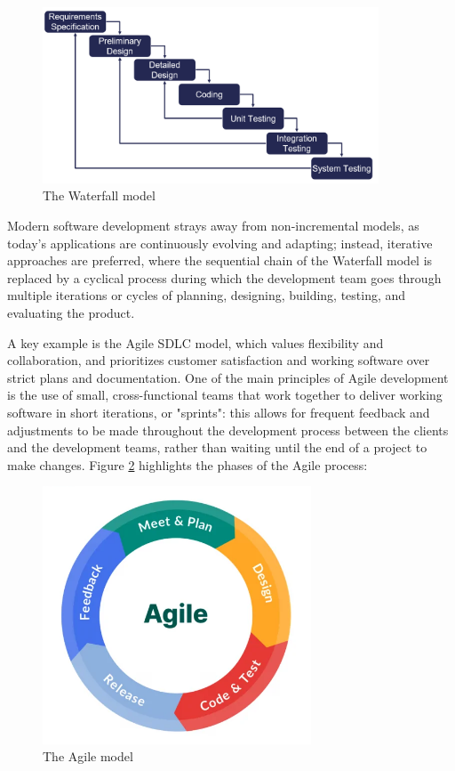 \begin{figure}[H]
    \centering
    \includegraphics[width=10cm, scale=0.5]{figures/waterfall_model.png}
    \caption{The Waterfall model}
    \label{waterfall_model}
\end{figure}

Modern software development strays away from non-incremental models, as today's applications are continuously evolving and adapting; instead, iterative approaches are preferred, where the sequential chain of the Waterfall model is replaced by a cyclical process during which the development team goes through multiple iterations or cycles of planning, designing, building, testing, and evaluating the product.

A key example is the Agile SDLC model, which values flexibility and collaboration, and prioritizes customer satisfaction and working software over strict plans and documentation. One of the main principles of Agile development is the use of small, cross-functional teams that work together to deliver working software in short iterations, or "sprints": this allows for frequent feedback and adjustments to be made throughout the development process between the clients and the development teams, rather than waiting until the end of a project to make changes.
Figure \ref{agile_model} highlights the phases of the Agile process:

\begin{figure}[h]
    \centering
    \includegraphics[width=8cm, scale=0.2]{figures/agile_model.jpg}
    \caption{The Agile model}
    \label{agile_model}
\end{figure}


